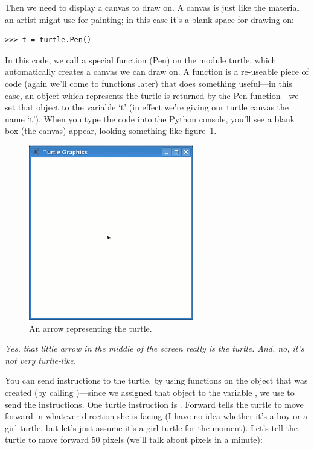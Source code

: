Then we need to display a canvas to draw on.  A canvas is just like the material an artist might use for painting; in this case it's a blank space for drawing on:

\begin{listing}
\begin{verbatim}
>>> t = turtle.Pen()
\end{verbatim}
\end{listing}

In this code, we call a special function (Pen) on the module turtle, which automatically creates a canvas we can draw on.  A function is a re-useable piece of code (again we'll come to functions later) that does something useful---in this case, an object which represents the turtle is returned by the Pen function---we set that object to the variable `t' (in effect we're giving our turtle canvas the name `t'). When you type the code into the Python console, you'll see a blank box (the canvas) appear, looking something like figure~\ref{fig10}.

\begin{figure}
\begin{center}
\includegraphics[width=72mm]{eps/figure10.eps}
\end{center}
\caption{An arrow representing the turtle.}\label{fig10}
\end{figure}

\emph{Yes, that little arrow in the middle of the screen really is the turtle.  And, no, it's not very turtle-like.}

You can send instructions to the turtle, by using functions on the object that was created (by calling )---since we assigned that object to the variable , we use  to send the instructions.
One turtle instruction is .  Forward tells the turtle to move forward in whatever direction she is facing (I have no idea whether it's a boy or a girl turtle, but let's just assume it's a girl-turtle for the moment). Let's tell the turtle to move forward 50 pixels (we'll talk about pixels in a minute):

